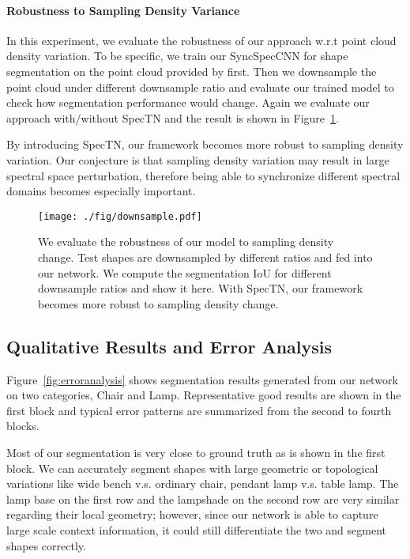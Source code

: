 \documentclass[10pt,twocolumn,letterpaper]{article}
\begin{document}
\paragraph{Robustness to Sampling Density Variance}
In this experiment, we evaluate the robustness of our approach w.r.t point cloud density variation. To be specific, we train our SyncSpecCNN for shape segmentation on the point cloud provided by \cite{Yi16} first. Then we downsample the point cloud under different downsample ratio and evaluate our trained model to check how segmentation performance would change. Again we evaluate our approach with/without SpecTN and the result is shown in Figure~\ref{fig:downsample}.
 
By introducing SpecTN, our framework becomes more robust to sampling density variation. Our conjecture is that sampling density variation may result in large spectral space perturbation, therefore being able to synchronize different spectral domains becomes especially important.

\begin{figure}
 \centering
 \texttt{[image: ./fig/downsample.pdf]}
 \caption{We evaluate the robustness of our model to sampling density change. Test shapes are downsampled by different ratios and fed into our network. We compute the segmentation IoU for different downsample ratios and show it here. With SpecTN, our framework becomes more robust to sampling density change.}
 \label{fig:downsample}
\end{figure}



\subsection{Qualitative Results and Error Analysis}
Figure~\ref{fig:erroranalysis} shows segmentation results generated from our network on two categories, Chair and Lamp. Representative good results are shown in the first block and  typical error patterns are summarized from the second to fourth blocks.

Most of our segmentation is very close to ground truth as is shown in the first block. We can accurately segment shapes with large geometric or topological variations like wide bench v.s. ordinary chair, pendant lamp v.s. table lamp. The lamp base on the first row and the lampshade on the second row are very similar regarding their local geometry; however, since our network is able to capture large scale context information, it could still differentiate the two and segment shapes correctly.
\end{document}
